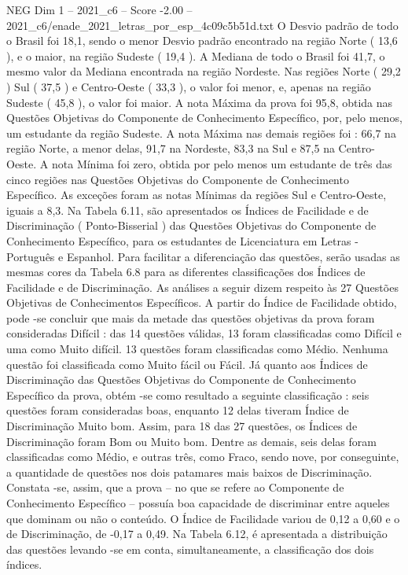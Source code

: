 \begin{textsample}{NEG Dim 1 – 2021\_c6 – Score -2.00 – 2021\_c6/enade\_2021\_letras\_por\_esp\_4c09c5b51d.txt}
O Desvio padrão de todo o Brasil foi 18,1, sendo o menor Desvio padrão encontrado na região Norte ( 13,6 ), e o maior, na região Sudeste ( 19,4 ).
A Mediana de todo o Brasil foi 41,7, o mesmo valor da Mediana encontrada na região Nordeste.
Nas regiões Norte ( 29,2 ) Sul ( 37,5 ) e Centro-Oeste ( 33,3 ), o valor foi menor, e, apenas na região Sudeste ( 45,8 ), o valor foi maior.
A nota Máxima da prova foi 95,8, obtida nas Questões Objetivas do Componente de Conhecimento Específico, por, pelo menos, um estudante da região Sudeste.
A nota Máxima nas demais regiões foi : 66,7 na região Norte, a menor delas, 91,7 na Nordeste, 83,3 na Sul e 87,5 na Centro-Oeste.
A nota Mínima foi zero, obtida por pelo menos um estudante de três das cinco regiões nas Questões Objetivas do Componente de Conhecimento Específico.
As exceções foram as notas Mínimas da regiões Sul e Centro-Oeste, iguais a 8,3.
Na Tabela 6.11, são apresentados os Índices de Facilidade e de Discriminação ( Ponto-Bisserial ) das Questões Objetivas do Componente de Conhecimento Específico, para os estudantes de Licenciatura em Letras - Português e Espanhol.
Para facilitar a diferenciação das questões, serão usadas as mesmas cores da Tabela 6.8 para as diferentes classificações dos Índices de Facilidade e de Discriminação.
As análises a seguir dizem respeito às 27 Questões Objetivas de Conhecimentos Específicos.
A partir do Índice de Facilidade obtido, pode -se concluir que mais da metade das questões objetivas da prova foram consideradas Difícil : das 14 questões válidas, 13 foram classificadas como Difícil e uma como Muito difícil. 13 questões foram classificadas como Médio.
Nenhuma questão foi classificada como Muito fácil ou Fácil.
Já quanto aos Índices de Discriminação das Questões Objetivas do Componente de Conhecimento Específico da prova, obtém -se como resultado a seguinte classificação : seis questões foram consideradas boas, enquanto 12 delas tiveram Índice de Discriminação Muito bom.
Assim, para 18 das 27 questões, os Índices de Discriminação foram Bom ou Muito bom.
Dentre as demais, seis delas foram classificadas como Médio, e outras três, como Fraco, sendo nove, por conseguinte, a quantidade de questões nos dois patamares mais baixos de Discriminação.
Constata -se, assim, que a prova – no que se refere ao Componente de Conhecimento Específico – possuía boa capacidade de discriminar entre aqueles que dominam ou não o conteúdo.
O Índice de Facilidade variou de 0,12 a 0,60 e o de Discriminação, de -0,17 a 0,49.
Na Tabela 6.12, é apresentada a distribuição das questões levando -se em conta, simultaneamente, a classificação dos dois índices.

\end{textsample}
